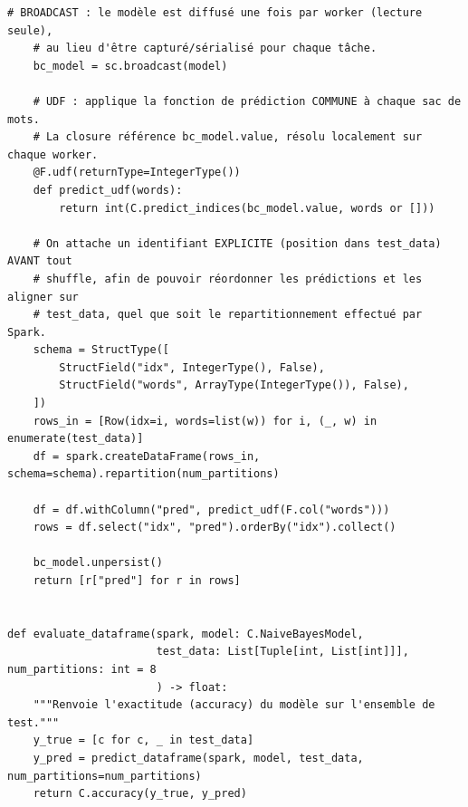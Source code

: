 \begin{lstlisting}[style=py]
    # BROADCAST : le modèle est diffusé une fois par worker (lecture seule),
    # au lieu d'être capturé/sérialisé pour chaque tâche.
    bc_model = sc.broadcast(model)

    # UDF : applique la fonction de prédiction COMMUNE à chaque sac de mots.
    # La closure référence bc_model.value, résolu localement sur chaque worker.
    @F.udf(returnType=IntegerType())
    def predict_udf(words):
        return int(C.predict_indices(bc_model.value, words or []))

    # On attache un identifiant EXPLICITE (position dans test_data) AVANT tout
    # shuffle, afin de pouvoir réordonner les prédictions et les aligner sur
    # test_data, quel que soit le repartitionnement effectué par Spark.
    schema = StructType([
        StructField("idx", IntegerType(), False),
        StructField("words", ArrayType(IntegerType()), False),
    ])
    rows_in = [Row(idx=i, words=list(w)) for i, (_, w) in enumerate(test_data)]
    df = spark.createDataFrame(rows_in, schema=schema).repartition(num_partitions)

    df = df.withColumn("pred", predict_udf(F.col("words")))
    rows = df.select("idx", "pred").orderBy("idx").collect()

    bc_model.unpersist()
    return [r["pred"] for r in rows]


def evaluate_dataframe(spark, model: C.NaiveBayesModel,
                       test_data: List[Tuple[int, List[int]]], num_partitions: int = 8
                       ) -> float:
    """Renvoie l'exactitude (accuracy) du modèle sur l'ensemble de test."""
    y_true = [c for c, _ in test_data]
    y_pred = predict_dataframe(spark, model, test_data, num_partitions=num_partitions)
    return C.accuracy(y_true, y_pred)
\end{lstlisting}
